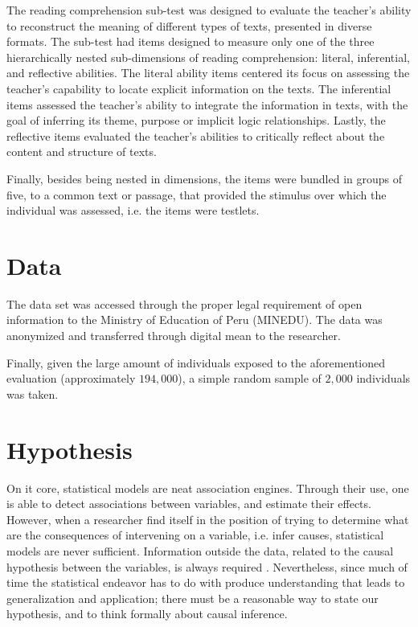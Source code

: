 The reading comprehension sub-test was designed to evaluate the teacher's ability to reconstruct the meaning of different types of texts, presented in diverse formats. The sub-test had items designed to measure only one of the three hierarchically nested sub-dimensions of reading comprehension: literal, inferential, and reflective abilities. The literal ability items centered its focus on assessing the teacher's capability to locate explicit information on the texts. The inferential items assessed the teacher's ability to integrate the information in texts, with the goal of inferring its theme, purpose or implicit logic relationships. Lastly, the reflective items evaluated the teacher's abilities to critically reflect about the content and structure of texts.

Finally, besides being nested in dimensions, the items were bundled in groups of five, to a common text or passage, that provided the stimulus over which the individual was assessed, i.e. the items were testlets. 



\section{Data}

The data set was accessed through the proper legal requirement of open information to the Ministry of Education of Peru (MINEDU). The data was anonymized and transferred through digital mean to the researcher.

Finally, given the large amount of individuals exposed to the aforementioned evaluation (approximately $194,000$), a simple random sample of $2,000$ individuals was taken. 


\section{Hypothesis}

On it core, statistical models are neat association engines. Through their use, one is able to detect associations between variables, and estimate their effects. However, when a researcher find itself in the position of trying to determine what are the consequences of intervening on a variable, i.e. infer causes, statistical models are never sufficient. Information outside the data, related to the causal hypothesis between the variables, is always required \cite{McElreath_2020}. Nevertheless, since much of time the statistical endeavor has to do with produce understanding that leads to generalization and application; there must be a reasonable way to state our hypothesis, and to think formally about causal inference.

